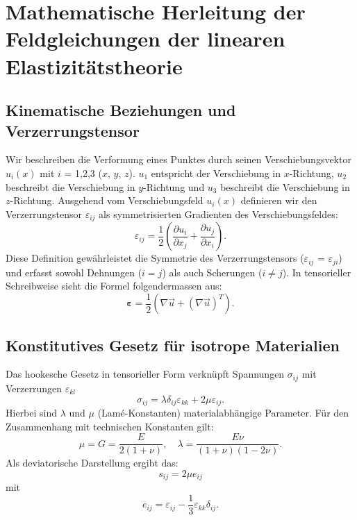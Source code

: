 %
%
%
%
\section{Mathematische Herleitung der Feldgleichungen der
linearen Elastizitätstheorie}
\label{elastomechanik:section:herleitung2}
%

\subsection{Kinematische Beziehungen und Verzerrungstensor}
Wir beschreiben die Verformung eines Punktes durch seinen
Verschiebungsvektor $u_i(x)$ mit $i$ = 1,2,3 ($x$, $y$, $z$).
$u_1$ entspricht der Verschiebung in $x$-Richtung, $u_2$ beschreibt
die Verschiebung in $y$-Richtung und $u_3$ beschreibt die Verschiebung
in $z$-Richtung.
Ausgehend vom Verschiebungsfeld $u_i(x)$ definieren wir den
Verzerrungstensor $\varepsilon_{ij}$ als symmetrisierten Gradienten
des Verschiebungsfeldes:
\begin{equation*}
	\varepsilon_{ij} = 
	\frac{1}{2} \left( \frac{\partial u_i}{\partial x_j} + \frac{\partial u_j}{\partial x_i} \right).
\end{equation*}
Diese Definition gewährleistet die Symmetrie des Verzerrungstensors
($\varepsilon_{ij}$ = $\varepsilon_{ji}$) und erfasst sowohl Dehnungen
($i = j$) als auch Scherungen ($i \neq j$).
In tensorieller Schreibweise sieht die Formel folgendermassen aus:
\begin{equation*}
	\boldsymbol{\varepsilon} = 
	\frac{1}{2} \left( \nabla \vec{u} + (\nabla \vec{u})^T \right).
\end{equation*}

\subsection{Konstitutives Gesetz für isotrope Materialien
\label{elastomechanik:math:subsection:isotrop}}
Das hookesche Gesetz in tensorieller Form verknüpft Spannungen
$\sigma_{ij}$ mit Verzerrungen $\varepsilon_{kl}$
\begin{equation}
	\sigma_{ij} = 
	\lambda \delta_{ij} \varepsilon_{kk} + 2\mu \varepsilon_{ij}.
\label{elastomechanik:math:eqn:materialgesetz}
\end{equation}
Hierbei sind $\lambda$ und $\mu$ (Lamé-Konstanten) materialabhängige
Parameter.
Für den Zusammenhang mit technischen Konstanten gilt:
\begin{equation*}
	\mu = 
	G = 
	\frac{E}{2(1+\nu)}, \quad \lambda = 
	\frac{E \nu}{(1+\nu)(1-2\nu)}.
\end{equation*}	
Als deviatorische Darstellung ergibt das:
\begin{equation*}
	s_{ij} =
	2\mu e_{ij}
\end{equation*}
mit
\begin{equation*}
	e_{ij} = 
	\varepsilon_{ij} - \frac{1}{3} \varepsilon_{kk} \delta_{ij}.
\end{equation*}


